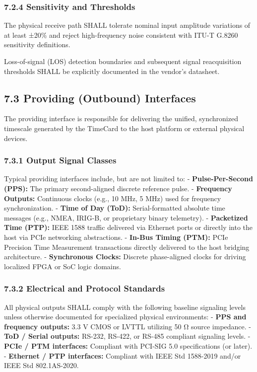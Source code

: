 \subsubsection{7.2.4 Sensitivity and
Thresholds}\label{sensitivity-and-thresholds}

The physical receive path SHALL tolerate nominal input amplitude
variations of at least ±20\% and reject high-frequency noise consistent
with ITU-T G.8260 sensitivity definitions.

Loss-of-signal (LOS) detection boundaries and subsequent signal
reacquisition thresholds SHALL be explicitly documented in the vendor's
datasheet.

\subsection{7.3 Providing (Outbound)
Interfaces}\label{providing-outbound-interfaces}

The providing interface is responsible for delivering the unified,
synchronized timescale generated by the TimeCard to the host platform or
external physical devices.

\subsubsection{7.3.1 Output Signal Classes}\label{output-signal-classes}

Typical providing interfaces include, but are not limited to: -
\textbf{Pulse-Per-Second (PPS):} The primary second-aligned discrete
reference pulse. - \textbf{Frequency Outputs:} Continuous clocks (e.g.,
10 MHz, 5 MHz) used for frequency synchronization. - \textbf{Time of Day
(ToD):} Serial-formatted absolute time messages (e.g., NMEA, IRIG-B, or
proprietary binary telemetry). - \textbf{Packetized Time (PTP):} IEEE
1588 traffic delivered via Ethernet ports or directly into the host via
PCIe networking abstractions. - \textbf{In-Bus Timing (PTM):} PCIe
Precision Time Measurement transactions directly delivered to the host
bridging architecture. - \textbf{Synchronous Clocks:} Discrete
phase-aligned clocks for driving localized FPGA or SoC logic domains.

\subsubsection{7.3.2 Electrical and Protocol
Standards}\label{electrical-and-protocol-standards}

All physical outputs SHALL comply with the following baseline signaling
levels unless otherwise documented for specialized physical
environments: - \textbf{PPS and frequency outputs:} 3.3 V CMOS or LVTTL
utilizing 50 Ω source impedance. - \textbf{ToD / Serial outputs:}
RS-232, RS-422, or RS-485 compliant signaling levels. - \textbf{PCIe /
PTM interfaces:} Compliant with PCI-SIG 5.0 specifications (or later). -
\textbf{Ethernet / PTP interfaces:} Compliant with IEEE Std 1588-2019
and/or IEEE Std 802.1AS-2020.

